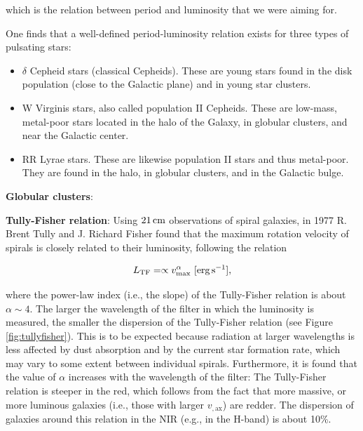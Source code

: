 \documentclass[a4paper,11pt]{article}
\begin{document}
{\noindent}which is the relation between period and luminosity that we were aiming for.

{\noindent}One finds that a well-defined period-luminosity relation exists for three types of pulsating stars:

\begin{itemize}
    \item $\delta$ Cepheid stars (classical Cepheids). These are young stars found in the disk population (close to the Galactic plane) and in young star clusters.
    \item W Virginis stars, also called population II Cepheids. These are low-mass, metal-poor stars located in the halo of the Galaxy, in globular clusters, and near the Galactic center.
    \item RR Lyrae stars. These are likewise population II stars and thus metal-poor. They are found in the halo, in globular clusters, and in the Galactic bulge.
\end{itemize}

{\noindent}\textbf{Globular clusters}: 

{\noindent}\textbf{Tully-Fisher relation}: Using $21\,{\rm cm}$ observations of spiral galaxies, in 1977 R. Brent Tully and J. Richard Fisher found that the maximum rotation velocity of spirals is closely related to their luminosity, following the relation

\begin{align*}
    L_\mathrm{TF} = \propto v_\mathrm{max}^\alpha ~ [{\rm erg\,s^{-1}}],
\end{align*}

{\noindent}where the power-law index (i.e., the slope) of the Tully-Fisher relation is about $\alpha\sim4$. The larger the wavelength of the filter in which the luminosity is measured, the smaller the dispersion of the Tully-Fisher relation (see Figure \ref{fig:tullyfisher}). This is to be expected because radiation at larger wavelengths is less affected by dust absorption and by the current star formation rate, which may vary to some extent between individual spirals. Furthermore, it is found that the value of $\alpha$ increases with the wavelength of the filter: The Tully-Fisher relation is steeper in the red, which follows from the fact that more massive, or more luminous galaxies (i.e., those with larger $v_\mathrm{,ax}$) are redder. The dispersion of galaxies around this relation in the NIR (e.g., in the H-band) is about 10\%.
\end{document}
